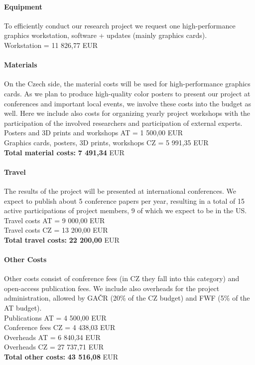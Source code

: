\documentclass[11pt,a4paper,titlepage,oneside,onecolumn]{article}
\begin{document}
\paragraph{Equipment}
To efficiently conduct our research project we request one high-performance graphics workstation, software + updates (mainly graphics cards).\\
Workstation = 11 826,77 EUR 
 
\paragraph{Materials}
On the Czech side, the material costs will be used for high-performance graphics cards. As we plan to produce high-quality color posters to present our project at conferences and important local events, we involve these costs into the budget as well. Here we include also costs for organizing yearly project workshops with the participation of the involved researchers and participation of external experts.\\
Posters and 3D prints and workshops AT = 1 500,00 EUR\\
Graphics cards, posters, 3D prints, workshops CZ = 5 991,35 EUR\\
\textbf{Total material costs:}   \textbf{7 491,34} EUR

\paragraph{Travel}
The results of the project will be presented at international conferences. We expect to publish about 5 conference papers per year, resulting in a total of 15 active participations of project members, 9 of which we expect to be in the US.\\
Travel costs AT = 9 000,00 EUR\\
Travel costs CZ = 13 200,00 EUR\\
\textbf{Total travel costs:}   \textbf{22 200,00} EUR

\paragraph{Other Costs}
Other costs consist of conference fees (in CZ they fall into this category) and open-access publication fees. We include also overheads for the project administration, allowed by GA\v{C}R (20\% of the CZ budget) and FWF (5\% of the AT budget).\\
Publications AT = 4 500,00 EUR\\
Conference fees CZ = 4 438,03 EUR\\
Overheads AT = 6 840,34 EUR\\
Overheads CZ = 27 737,71 EUR\\
\textbf{Total other costs:}   \textbf{43 516,08} EUR
\end{document}
